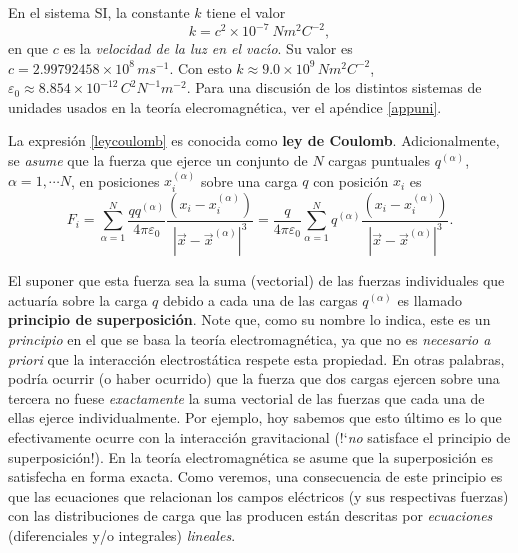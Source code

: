 En el sistema SI, la constante
$k$ tiene el valor
\begin{equation}
k=c^2\times 10^{-7}\ Nm^2C^{-2},
\end{equation}
en que $c$ es la \textit{velocidad de la luz en el vac\'{\i}o}. Su valor es $c=2.99792458\times 10^{8}\,ms^{-1}$. Con esto $k\approx 9.0\times
10^{9}\,Nm^2C^{-2}$, $\varepsilon _0\approx 8.854\times 10^{-12}
\,C^2N^{-1}m^{-2}$. Para una discusión de los distintos sistemas de unidades usados en la teoría elecromagnética, ver el apéndice \ref{appuni}.

La expresión \eqref{leycoulomb} es conocida como \textbf{ley de Coulomb}. Adicionalmente, se \textit{asume} que la fuerza que ejerce un conjunto de $N$ cargas puntuales $q^{(\alpha)}$, $\alpha=1,\cdots N$, en posiciones $x^{(\alpha)}_i$ sobre una carga $q$ con posición $x_i$ es
\begin{equation}
F_i   =\sum_{\alpha=1}^{N}\frac{qq^{(\alpha)}}{4\pi\varepsilon_0}\frac{\left(
x_i-x^{(\alpha)}_i\right)  }{\left\vert  \vec x-\vec x^{(\alpha)}\right\vert^3}
=\frac{q}{4\pi\varepsilon_0}\sum_{\alpha=1}^{N}q^{(\alpha)}\frac{\left(
x_i-x^{(\alpha)}_i\right) }{\left\vert  \vec x-\vec
x^{(\alpha)}\right\vert^3}.\label{leycoulomb-discre}
\end{equation}

El suponer que esta fuerza sea la suma (vectorial) de las fuerzas individuales que actuaría sobre la carga $q$ debido a cada una de las cargas $q^{(\alpha)}$ es llamado \textbf{principio de superposición}. Note que, como su nombre lo indica, este es un \textit{principio} en el que se basa la teoría electromagnética, ya que no es \textit{necesario a priori} que la interacción electrostática respete esta propiedad. En otras palabras, podría ocurrir (o haber ocurrido) que la fuerza que dos cargas ejercen sobre una tercera no fuese \textit{exactamente} la suma vectorial de las fuerzas que cada una de ellas ejerce individualmente. Por ejemplo, hoy sabemos que esto último es lo que efectivamente ocurre con la interacción gravitacional (!`\textit{no} satisface el principio de superposición!). En la teoría electromagnética se asume que la superposición es satisfecha en forma exacta. Como veremos, una consecuencia de este principio es que las ecuaciones que relacionan los campos eléctricos (y sus respectivas fuerzas) con las distribuciones de carga que las producen están descritas por \textit{ecuaciones} (diferenciales y/o integrales) \textit{lineales}.


